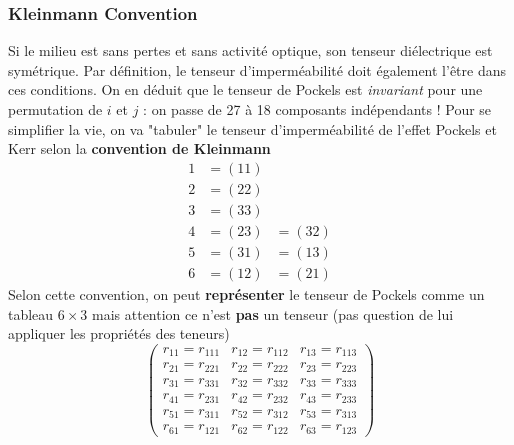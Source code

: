 \subsubsection{Kleinmann Convention}
Si le milieu est sans pertes et sans activité optique, son tenseur diélectrique est symétrique. Par 
définition, le tenseur d'imperméabilité doit également l’être dans ces conditions. On en déduit que
le tenseur de Pockels est \textit{invariant} pour une permutation de $i$ et $j$ : on passe de 27 à 
18 composants indépendants ! Pour se simplifier la vie, on va "tabuler" le tenseur d'imperméabilité 
de l'effet Pockels et Kerr selon la \textbf{convention de Kleinmann}
\begin{equation}
\begin{array}{lll}
1&=(11)\\
2&=(22)\\
3&=(33)\\
4&=(23)&=(32)\\
5&=(31)&=(13)\\
6&=(12)&=(21)
\end{array}
\end{equation}
Selon cette convention, on peut \textbf{représenter} le tenseur de Pockels comme un tableau $6\times 3$ 
mais attention ce n'est \textbf{pas} un tenseur (pas question de lui appliquer les propriétés des teneurs)
\begin{equation}
\left(\begin{array}{ccc}
r_{11} = r_{111} & r_{12} = r_{112} & r_{13} = r_{113}\\
r_{21} = r_{221} & r_{22} = r_{222} & r_{23} = r_{223}\\
r_{31} = r_{331} & r_{32} = r_{332} & r_{33} = r_{333}\\
r_{41} = r_{231} & r_{42} = r_{232} & r_{43} = r_{233}\\
r_{51} = r_{311} & r_{52} = r_{312} & r_{53} = r_{313}\\
r_{61} = r_{121} & r_{62} = r_{122} & r_{63} = r_{123}
\end{array}\right)
\end{equation}

\newpage
